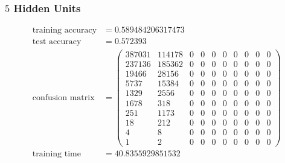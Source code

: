 \documentclass[11pt]{article}
\begin{document}
\subsubsection{$5$ Hidden Units}
\begin{equation}
  \begin{split}
    \text{training accuracy} &= 0.589484206317473\\
    \text{test accuracy} &= 0.572393\\
    \text{confusion matrix} &=
    \begin{pmatrix}
      387031 & 114178 & 0 & 0 & 0 & 0 & 0 & 0 & 0 & 0 \\
      237136 & 185362 & 0 & 0 & 0 & 0 & 0 & 0 & 0 & 0 \\
      19466  & 28156  & 0 & 0 & 0 & 0 & 0 & 0 & 0 & 0 \\
      5737   & 15384  & 0 & 0 & 0 & 0 & 0 & 0 & 0 & 0 \\
      1329   & 2556   & 0 & 0 & 0 & 0 & 0 & 0 & 0 & 0 \\
      1678   & 318    & 0 & 0 & 0 & 0 & 0 & 0 & 0 & 0 \\
      251    & 1173   & 0 & 0 & 0 & 0 & 0 & 0 & 0 & 0 \\
      18     & 212    & 0 & 0 & 0 & 0 & 0 & 0 & 0 & 0 \\
      4      & 8      & 0 & 0 & 0 & 0 & 0 & 0 & 0 & 0 \\
      1      & 2      & 0 & 0 & 0 & 0 & 0 & 0 & 0 & 0
    \end{pmatrix}\\
    \text{training time} &= 40.8355929851532
  \end{split}
\end{equation}
\end{document}
